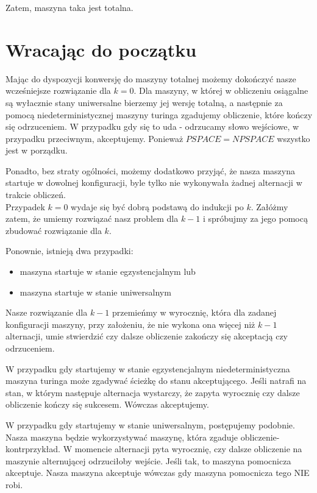 \documentclass[a4paper,11pt]{article}
\begin{document}
Zatem, maszyna taka jest totalna.


\section*{Wracając do początku}

Mając do dyspozycji konwersję do maszyny totalnej możemy dokończyć nasze
wcześniejsze rozwiązanie dla $k=0$. Dla maszyny, w której w obliczeniu osiągalne
są wyłacznie stany uniwersalne bierzemy jej wersję totalną, a następnie za
pomocą niedeterministycznej maszyny turinga zgadujemy obliczenie, które kończy
się odrzuceniem. W przypadku gdy się to uda - odrzucamy słowo wejściowe, w
przypadku przeciwnym, akceptujemy. Ponieważ $PSPACE = NPSPACE$ wszystko jest w
porządku.

Ponadto, bez straty ogólności, możemy dodatkowo przyjąć, że nasza maszyna
startuje w dowolnej konfiguracji, byle tylko nie wykonywała żadnej alternacji
w trakcie obliczeń. \\


Przypadek $k=0$ wydaje się być dobrą podstawą do indukcji po $k$. Załóżmy zatem,
że umiemy rozwiązać nasz problem dla $k-1$ i spróbujmy za jego pomocą zbudować
rozwiązanie dla $k$.

Ponownie, istnieją dwa przypadki:
\begin{itemize}
  \item{maszyna startuje w stanie egzystencjalnym lub}
  \item{maszyna startuje w stanie uniwersalnym}
\end{itemize}

Nasze rozwiązanie dla $k-1$ przemieńmy w wyrocznię, która dla zadanej
konfiguracji maszyny, przy założeniu, że nie wykona ona więcej niż $k-1$
alternacji, umie stwierdzić czy dalsze obliczenie zakończy się akceptacją czy
odrzuceniem.

W przypadku gdy startujemy w stanie egzystencjalnym niedeterministyczna maszyna
turinga może zgadywać ścieżkę do stanu akceptującego. Jeśli natrafi na stan, w
którym następuje alternacja wystarczy, że zapyta wyrocznię czy dalsze obliczenie
kończy się sukcesem. Wówczas akceptujemy.

W przypadku gdy startujemy w stanie uniwersalnym, postępujemy podobnie. Nasza
maszyna będzie wykorzystywać maszynę, która zgaduje obliczenie-kontrprzykład. W
momencie alternacji pyta wyrocznię, czy dalsze obliczenie na maszynie
alternującej odrzuciłoby wejście. Jeśli tak, to maszyna pomocnicza akceptuje.
Nasza maszyna akceptuje wówczas gdy maszyna pomocnicza tego NIE robi.
\end{document}
